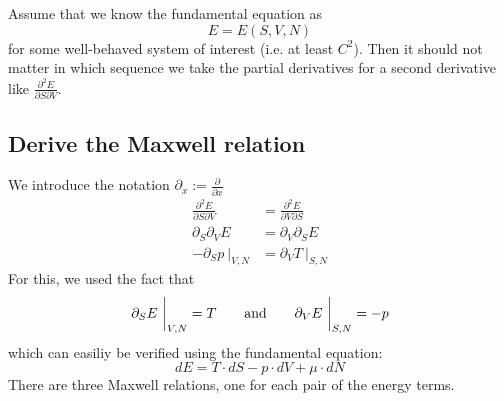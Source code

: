 Assume that we know the fundamental equation as 
\begin{equation}
    E=E(S,V,N) 
\end{equation}
for some well-behaved system of interest (i.e. at least $C^2$). Then it should 
not matter in which sequence we take the partial derivatives for a second 
derivative like $\frac{\partial^2 E}{\partial S\partial V}$.

\subsection{Derive the Maxwell relation}
    We introduce the notation $\partial_x:=\frac{\partial}{\partial x}$
    \begin{align}
        \frac{\partial^2 E}{\partial S\partial V}
        &=\frac{\partial^2 E}{\partial V\partial S} \\
        \partial_S\partial_V E &=\partial_V\partial_S E \\
        -\partial_S p\ \bigg|_{V,N} &= \partial_V T\ \bigg|_{S,N} 
    \end{align}
    For this, we used the fact that
    \begin{equation}
        \partial_S E\ \bigg|_{V,N}=T
        \ \ \ \ \ \ \textnormal{and}\ \ \ \ \ \
        \partial_V E\ \bigg|_{S,N}=-p
    \end{equation}
    which can easiliy be verified using the fundamental equation:
    \begin{equation}
        dE=T\cdot dS-p\cdot dV+\mu\cdot dN
    \end{equation}
    There are three Maxwell relations, one for each pair of the energy terms.

\newpage
